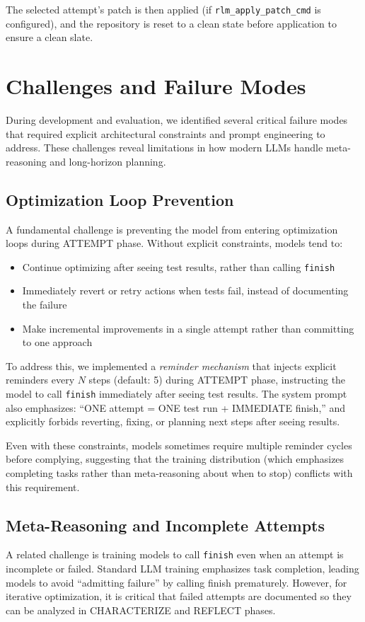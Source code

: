\documentclass{article}
\theoremstyle{plain}
\theoremstyle{definition}
\theoremstyle{remark}
\begin{document}
The selected attempt's patch is then applied (if \texttt{rlm\_apply\_patch\_cmd} is configured), and the repository is reset to a clean state before application to ensure a clean slate.

\section{Challenges and Failure Modes}
\label{sec:challenges}
During development and evaluation, we identified several critical failure modes that required explicit architectural constraints and prompt engineering to address. These challenges reveal limitations in how modern LLMs handle meta-reasoning and long-horizon planning.

\subsection{Optimization Loop Prevention}
A fundamental challenge is preventing the model from entering optimization loops during ATTEMPT phase. Without explicit constraints, models tend to:
\begin{itemize}
    \item Continue optimizing after seeing test results, rather than calling \texttt{finish}
    \item Immediately revert or retry actions when tests fail, instead of documenting the failure
    \item Make incremental improvements in a single attempt rather than committing to one approach
\end{itemize}

To address this, we implemented a \emph{reminder mechanism} that injects explicit reminders every $N$ steps (default: 5) during ATTEMPT phase, instructing the model to call \texttt{finish} immediately after seeing test results. The system prompt also emphasizes: ``ONE attempt = ONE test run + IMMEDIATE finish,'' and explicitly forbids reverting, fixing, or planning next steps after seeing results.

Even with these constraints, models sometimes require multiple reminder cycles before complying, suggesting that the training distribution (which emphasizes completing tasks rather than meta-reasoning about when to stop) conflicts with this requirement.

\subsection{Meta-Reasoning and Incomplete Attempts}
A related challenge is training models to call \texttt{finish} even when an attempt is incomplete or failed. Standard LLM training emphasizes task completion, leading models to avoid ``admitting failure'' by calling finish prematurely. However, for iterative optimization, it is critical that failed attempts are documented so they can be analyzed in CHARACTERIZE and REFLECT phases.
\end{document}
